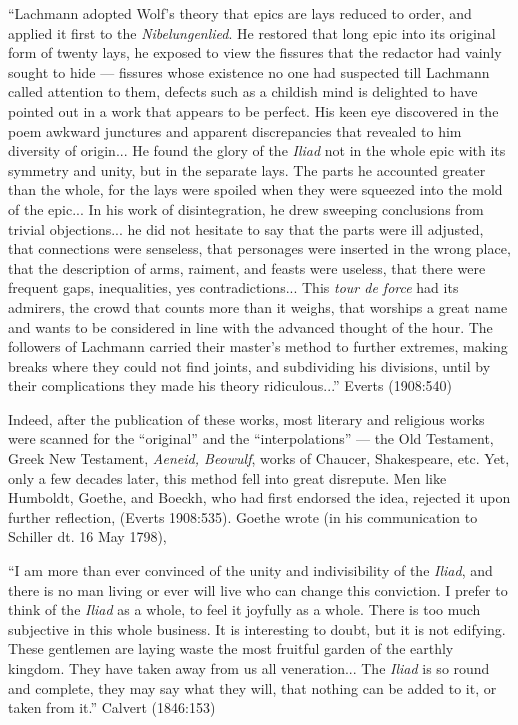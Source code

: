 \begin{myquote}
“Lachmann adopted Wolf’s theory that epics are lays reduced to order, and applied it first to the {\sl Nibelungenlied}. He restored that long epic into its original form of twenty lays, he exposed to view the fissures that the redactor had vainly sought to hide --- fissures whose existence no one had suspected till Lachmann called attention to them, defects such as a childish mind is delighted to have pointed out in a work that appears to be perfect. His keen eye discovered in the poem awkward junctures and apparent discrepancies that revealed to him diversity of origin... He found the glory of the {\sl Iliad} not in the whole epic with its symmetry and unity, but in the separate lays. The parts he accounted greater than the whole, for the lays were spoiled when they were squeezed into the mold of the epic...  In his work of disintegration, he drew sweeping conclusions from trivial objections... he did not hesitate to say that the parts were ill adjusted, that connections were senseless, that personages were inserted in the wrong place, that the description of arms, raiment, and feasts were useless, that there were frequent gaps, inequalities, yes contradictions...  This {\sl tour de force} had its admirers, the crowd that counts more than it weighs, that worships a great name and wants to be considered in line with the advanced thought of the hour. The followers of Lachmann carried their master's method to further extremes, making breaks where they could not find joints, and subdividing his divisions, until by their complications they made his theory ridiculous...”
\hfill Everts (1908:540)
\end{myquote}

Indeed, after the publication of these works, most literary and religious works were scanned for the “original” and the “interpolations” --- the Old Testament, Greek New Testament, {\sl Aeneid, Beowulf}, works of Chaucer, Shakespeare, etc. Yet, only a few decades later, this method fell into great disrepute. Men like Humboldt, Goethe, and Boeckh, who had first endorsed the idea, rejected it upon further reflection, (Everts 1908:535). Goethe wrote (in his communication to Schiller dt. 16 May 1798),

\begin{myquote}
“I am more than ever convinced of the unity and indivisibility of the {\sl Iliad}, and there is no man living or ever will live who can change this conviction. I prefer to think of the {\sl Iliad} as a whole, to feel it joyfully as a whole. There is too much subjective in this whole business. It is interesting to doubt, but it is not edifying. These gentlemen are laying waste the most fruitful garden of the earthly kingdom. They have taken away from us all veneration... The {\sl Iliad} is so round and complete, they may say what they will, that nothing can be added to it, or taken from it.”
\hfill Calvert (1846:153)
\end{myquote}

